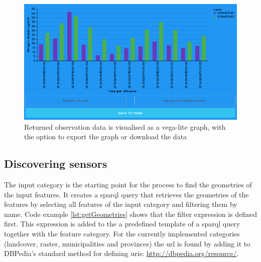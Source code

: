 \begin{figure}
	\centering
	\includegraphics[width=0.9\linewidth]{figs/interface4.PNG}
	\caption{Returned observation data is visualised as a vega-lite graph, with the option to export the graph or download the data}
	\label{fig:interface4}
\end{figure}  


\subsection{Discovering sensors}
\label{par:discoverSensors}
The input category is the starting point for the process to find the geometries of the input features. It creates a \ac{sparql} query that retrieves the geometries of the features by selecting all features of the input category and filtering them by name. Code example \ref{lst:getGeometries} shows that the filter expression is defined first. This expression is added to the a predefined template of a \ac{sparql} query together with the feature category. For the currently implemented categories (landcover, raster, municipalities and provinces) the \ac{url} is found by adding it to DBPedia's standard method for defining \acp{uri}: \url{http://dbpedia.org/resource/}.    

